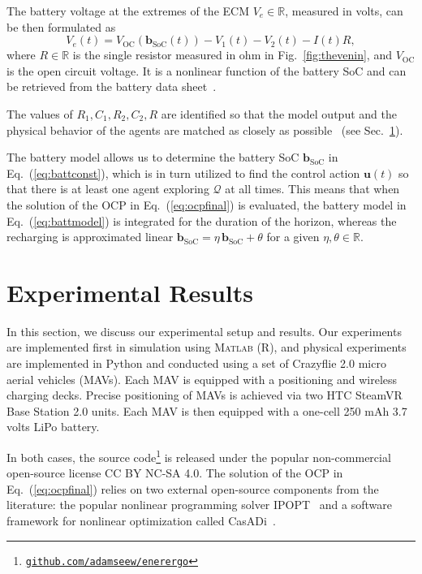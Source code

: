 \documentclass[lettersize,journal,twoside]{IEEEtran}
\theoremstyle{definition}
\begin{document}
The battery voltage at the extremes of the ECM $V_e\in\mathbb{R}$, measured in volts, can be then formulated as~\cite{zhao2017observability}
\begin{equation}
  V_e(t)=V_{\text{OC}}(\mathbf{b}_{\text{SoC}}(t))-V_1(t)-V_2(t)-I(t)R,
\end{equation}
where $R\in\mathbb{R}$ is the single resistor measured in ohm in Fig.~\ref{fig:thevenin}, and $V_{\text{OC}}$ is the open circuit voltage. It is a nonlinear function of the battery SoC and can be retrieved from the battery data sheet~\cite{hinz2019comparison}.

The values of $R_1,C_1,R_2,C_2,R$ are identified so that the model output and the physical behavior of the agents are matched as closely as possible~\cite{zhao2017observability} (see Sec.~\ref{sec:res}).

The battery model allows us to determine the battery SoC $\mathbf{b}_{\text{SoC}}$ in Eq.~(\ref{eq:battconst}), which is in turn utilized to find the control action $\mathbf{u}(t)$ so that there is at least one agent exploring $\mathcal{Q}$ at all times. This means that when the solution of the OCP in Eq.~(\ref{eq:ocpfinal}) is evaluated, the battery model in Eq.~(\ref{eq:battmodel}) is integrated for the duration of the horizon, whereas the recharging is approximated linear $\mathbf{b}_{\text{SoC}}=\eta\,\mathbf{b}_{\text{SoC}}+\theta$ for a given $\eta,\theta\in\mathbb{R}$.


\section{Experimental Results}\label{sec:res}
\noindent
In this section, we discuss our experimental setup and results. Our experiments are implemented first in simulation using  \textsc{Matlab} (R), and physical experiments  are implemented in Python and conducted using a set of Crazyflie 2.0 micro aerial vehicles (MAVs). Each MAV is equipped with a positioning and wireless charging decks. Precise positioning of MAVs is achieved via two HTC SteamVR Base Station 2.0 units. Each MAV is then equipped with a one-cell 250 mAh 3.7 volts LiPo battery.%

In both cases, the source code\footnote{{\tt\footnotesize\href{https://github.com/adamseew/enerergo}{github.com/adamseew/enerergo}}} is released under the popular non-commercial open-source license CC BY NC-SA 4.0. The solution of the OCP in Eq.~(\ref{eq:ocpfinal}) relies on two external open-source components from the literature: the popular nonlinear programming solver IPOPT~\cite{wachter2006implementation} and a software framework for nonlinear optimization called CasADi~\cite{andersson2012casadi}.
\end{document}
